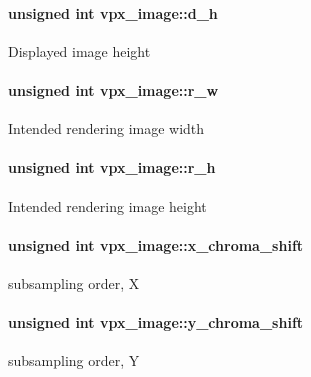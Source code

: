 \paragraph[{\texorpdfstring{d\+\_\+h}{d_h}}]{\setlength{\rightskip}{0pt plus 5cm}unsigned int vpx\+\_\+image\+::d\+\_\+h}\hypertarget{structvpx__image_a31bc5f045d4f3c2b6bb0f57bb53078e7}{}\label{structvpx__image_a31bc5f045d4f3c2b6bb0f57bb53078e7}
Displayed image height 
\paragraph[{\texorpdfstring{r\+\_\+w}{r_w}}]{\setlength{\rightskip}{0pt plus 5cm}unsigned int vpx\+\_\+image\+::r\+\_\+w}\hypertarget{structvpx__image_a1fe4736c2554836d510589cdbbece76a}{}\label{structvpx__image_a1fe4736c2554836d510589cdbbece76a}
Intended rendering image width 
\paragraph[{\texorpdfstring{r\+\_\+h}{r_h}}]{\setlength{\rightskip}{0pt plus 5cm}unsigned int vpx\+\_\+image\+::r\+\_\+h}\hypertarget{structvpx__image_ad969a04e4a11749f3718ef5909db6da8}{}\label{structvpx__image_ad969a04e4a11749f3718ef5909db6da8}
Intended rendering image height 
\paragraph[{\texorpdfstring{x\+\_\+chroma\+\_\+shift}{x_chroma_shift}}]{\setlength{\rightskip}{0pt plus 5cm}unsigned int vpx\+\_\+image\+::x\+\_\+chroma\+\_\+shift}\hypertarget{structvpx__image_affaf210489dcefebd90b87fd5f12dc0b}{}\label{structvpx__image_affaf210489dcefebd90b87fd5f12dc0b}
subsampling order, X 
\paragraph[{\texorpdfstring{y\+\_\+chroma\+\_\+shift}{y_chroma_shift}}]{\setlength{\rightskip}{0pt plus 5cm}unsigned int vpx\+\_\+image\+::y\+\_\+chroma\+\_\+shift}\hypertarget{structvpx__image_a1e3d9b699d46ca32e3916d1ac635a4a2}{}\label{structvpx__image_a1e3d9b699d46ca32e3916d1ac635a4a2}
subsampling order, Y 
